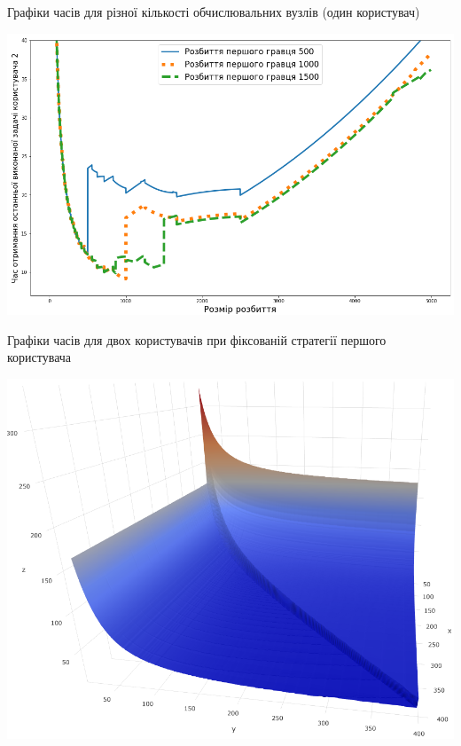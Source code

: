 \begin{frame}{Графіки часів для різної кількості обчислювальних вузлів (один користувач)}
	\manimate

	\includegraphics[width=0.7\linewidth]{im/two_users_fixed_first}
\end{frame}

\begin{frame}{Графіки часів для двох користувачів при фіксованій стратегії першого користувача}
	\manimate

	\includegraphics[width=0.6\linewidth]{im/two_users_surface_plot_20_400}
\end{frame}





